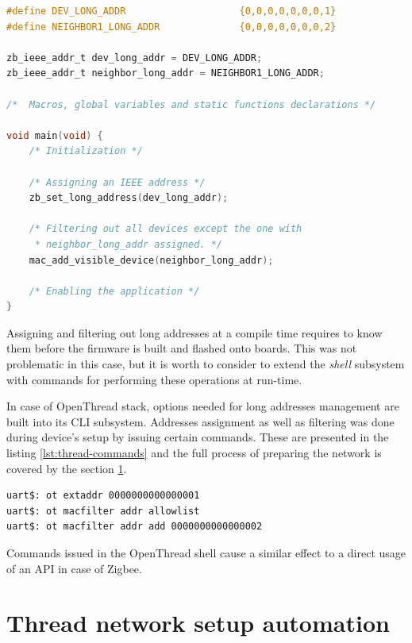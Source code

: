 \begin{lstlisting}[language=C, caption={An usage of the ZBOSS API for assigning and filtering long addresses}, label={lst:zigbee-long-addresses}]
#define DEV_LONG_ADDR                    {0,0,0,0,0,0,0,1}
#define NEIGHBOR1_LONG_ADDR              {0,0,0,0,0,0,0,2}

zb_ieee_addr_t dev_long_addr = DEV_LONG_ADDR;
zb_ieee_addr_t neighbor_long_addr = NEIGHBOR1_LONG_ADDR;

/*  Macros, global variables and static functions declarations */

void main(void) {
    /* Initialization */

    /* Assigning an IEEE address */
    zb_set_long_address(dev_long_addr);

    /* Filtering out all devices except the one with
     * neighbor_long_addr assigned. */
    mac_add_visible_device(neighbor_long_addr);

    /* Enabling the application */
}
\end{lstlisting}

Assigning and filtering out long addresses at a compile time requires to know
them before the firmware is built and flashed onto boards. This was not 
problematic in this case, but it is worth to consider to extend the 
\textit{shell} subsystem with commands for performing these operations at 
run-time.

In case of OpenThread stack, options needed
for long addresses management are built into its CLI subsystem. Addresses 
assignment as well as filtering was done during device's setup by issuing
certain commands. These are presented in the listing \ref{lst:thread-commands} 
and the full process of preparing the network is covered by the section \ref{sec:tests-automation}.

\begin{lstlisting}[language=bash, label={lst:thread-commands}, caption={Shell OpenThread commands for assigning and filtering IEEE addresses}]
uart$: ot extaddr 0000000000000001
uart$: ot macfilter addr allowlist
uart$: ot macfilter addr add 0000000000000002
\end{lstlisting}

Commands issued in the OpenThread shell cause a similar effect to a direct usage
of an API in case of Zigbee.

\section{Thread network setup automation}
\label{sec:tests-automation}

